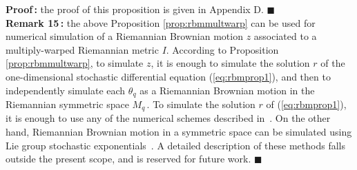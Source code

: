 \documentclass{svmult}
\begin{document}
\textbf{Proof\,:} the proof of this proposition is given in Appendix D. \hfill$\blacksquare$ \\[0.1cm]
\textbf{Remark 15\,:} the above Proposition \ref{prop:rbmmultwarp} can be used for numerical simulation of a Riemannian Brownian motion $z$ associated to a multiply-warped Riemannian metric $I$. According to Proposition \ref{prop:rbmmultwarp}, to simulate $z$, it is enough to simulate the solution $r$ of the one-dimensional stochastic differential equation (\ref{eq:rbmprop1}), and then to independently simulate each $\theta_q$ as a Riemannian Brownian motion in the Riemannian symmetric space $M_q\,$. To simulate the solution $r$ of (\ref{eq:rbmprop1}), it is enough to use any of the numerical schemes described in~\cite{platen}. On the other hand, Riemannian Brownian motion in a symmetric space can be simulated using Lie group stochastic exponentials~\cite{liao,arnaudon,estrade}. A detailed description of these methods falls outside the present scope, and is reserved for future work. \hfill $\blacksquare$
     

\end{document}
